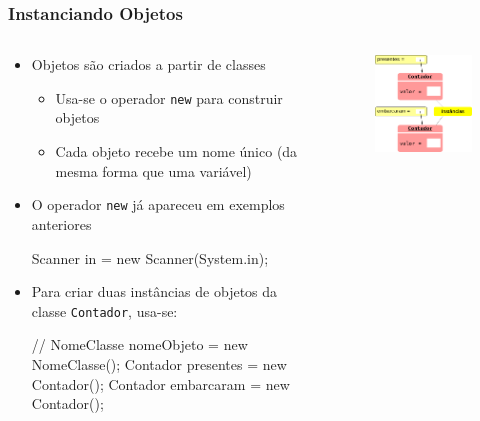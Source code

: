 \documentclass[xcolor={dvipsnames,table},aspectratio=169]{beamer}
\begin{document}
\begin{frame}[fragile]\frametitle{Instanciando Objetos}
\begin{columns}[T]
	\begin{column}{0.55\linewidth}
\begin{itemize}
	\item Objetos são criados a partir de classes
	\begin{itemize}
		\item Usa-se o operador \texttt{new} para construir objetos
		\item Cada objeto recebe um nome único (da mesma forma que uma variável)
	\end{itemize}
	\item O operador \texttt{new} já apareceu em exemplos anteriores
{\scriptsize
\begin{javacode}
Scanner in = new Scanner(System.in);
\end{javacode}
}
	\item Para criar duas instâncias de objetos da classe \texttt{Contador}, usa-se:
{\scriptsize
\begin{javacode}
// NomeClasse nomeObjeto = new NomeClasse();
Contador presentes  = new Contador();
Contador embarcaram = new Contador();
\end{javacode}
}
\end{itemize}
	\end{column}
	\begin{column}{0.45\linewidth}
\begin{figure}[h]
	\includegraphics[height=0.60\paperheight,center]{pucrs-ep-fprog-unidade_07-objetos_e_classes-laminas-objetos_contador.png}
\end{figure}
	\end{column}
\end{columns}
\end{frame}
\end{document}
